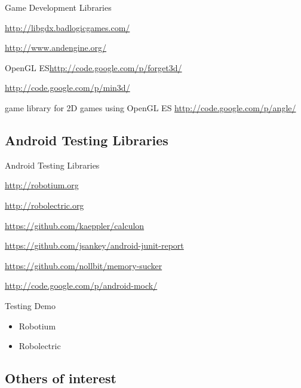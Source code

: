 \documentclass[aspectratio=169]{beamer}
\newcommand{\surl}[1] {{\tiny \url{#1}}}
\begin{document}
    \begin{frame}{Game Development Libraries}
      \begin{description}
       \item<1->[libgdx] \surl{http://libgdx.badlogicgames.com/}
        \item<2->[AndEngine] \surl{http://www.andengine.org/}
        
       \item<3->[forget3D] OpenGL ES\surl{http://code.google.com/p/forget3d/}
        \item<4->[min3d] \surl{http://code.google.com/p/min3d/}
        \item<5->[Angle] game library for 2D games using OpenGL ES \surl{http://code.google.com/p/angle/}
      \end{description}
    \end{frame}

  \subsection{Android Testing Libraries}

    \begin{frame}{Android Testing Libraries}
      \begin{description}
        \item<1->[Robotium] \surl{http://robotium.org}
        \item<2->[Robolectric] \surl{http://robolectric.org}
        \item<3->[Calculon] \surl{https://github.com/kaeppler/calculon}
        \item<4->[Android JUnit Report] \surl{https://github.com/jsankey/android-junit-report}
        \item<5->[Memory Sucker] \surl{https://github.com/nollbit/memory-sucker}
        \item<6->[Android Mock] \surl{http://code.google.com/p/android-mock/}
      \end{description}
    \end{frame}

    \begin{frame}{Testing Demo}
      \begin{itemize}
       \item Robotium
       \item Robolectric
      \end{itemize}
    \end{frame}

  \subsection{Others of interest}  
\end{document}
